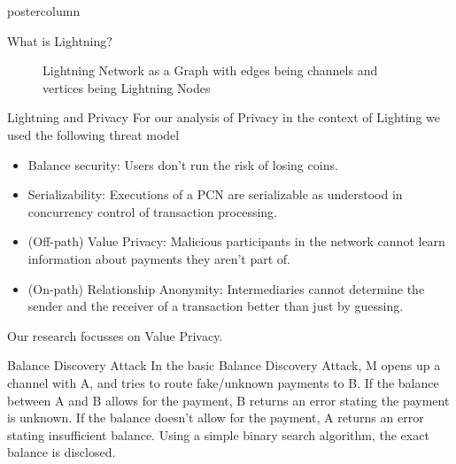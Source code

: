 \documentclass{beamer}
\begin{document}
\begin{frame}
\begin{columns}
\begin{column}{.5\textwidth}
\begin{beamercolorbox}[center]{postercolumn}
\begin{minipage}{.98\textwidth}
{\begin{myblock}{What is Lightning?}
\begin{figure}
\begin{minipage}{0.94\textwidth}
\begin{tikzpicture}
                    \end{tikzpicture}
                    \caption{Lightning Network as a Graph with edges being channels and vertices being Lightning Nodes}
								    \label{fig:network}
                  \end{minipage}
                \end{figure}
              \end{myblock}
              \begin{myblock}{Lightning and Privacy}
                For our analysis of Privacy in the context of Lighting we used the following threat model \cite{Malavolta2017}
                \begin{itemize}
                  \item Balance security: Users don't run the risk of losing coins.
                  \item Serializability: Executions of a PCN are serializable as understood in concurrency control of transaction processing.
                  \item (Off-path) Value Privacy: Malicious participants in the network cannot learn information about payments they aren't part of.
                  \item (On-path) Relationship Anonymity: Intermediaries cannot determine the sender and the receiver of a transaction better than just by guessing.
                \end{itemize}
                Our research focusses on Value Privacy.
              \end{myblock}
              \begin{myblock}{Balance Discovery Attack}
                In the basic Balance Discovery Attack\cite{Herrera-Joancomarti2019b}, M opens up a channel with A, and tries to route fake/unknown payments to B.
                If the balance between A and B allows for the payment, B returns an error stating the payment is unknown. If the balance doesn't allow for the payment, A returns an error stating insufficient balance. Using a simple binary search algorithm, the exact balance is disclosed.
                \begin{figure}
                  \begin{minipage}{0.94\textwidth}
                    \centering
                    \begin{tikzpicture}

\end{tikzpicture}
\end{minipage}
\end{figure}
\end{myblock}}
\end{minipage}
\end{beamercolorbox}
\end{column}
\end{columns}
\end{frame}
\end{document}
